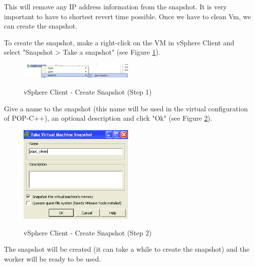 This will remove any IP address information from the snapshot. It is very important to have to shortest revert time possible. Once we have to clean Vm, we can create the snapshot. \s

To create the snapshot, make a right-click on the VM in vSphere Client  and select "Snapshot > Take a snapshot" (see Figure \ref{fig:snap_1}). 

\begin{figure}[ht]
	\caption{vSphere Client - Create Snapshot (Step 1)}
  	\centering
	\includegraphics[width=0.5\textwidth]{./pic/snap_1.png}
	\label{fig:snap_1}
\end{figure}


Give a name to the snapshot (this name will be used in the virtual configuration of POP-C++), an optional description and click "Ok" (see Figure \ref{fig:snap_2}). 

\begin{figure}[ht]
	\caption{vSphere Client - Create Snapshot (Step 2)}
  	\centering
	\includegraphics[width=0.5\textwidth]{./pic/snap_2.png}
	\label{fig:snap_2}
\end{figure}

The snapshot will be created (it can take a while to create the snapshot) and the worker will be ready to be used.

